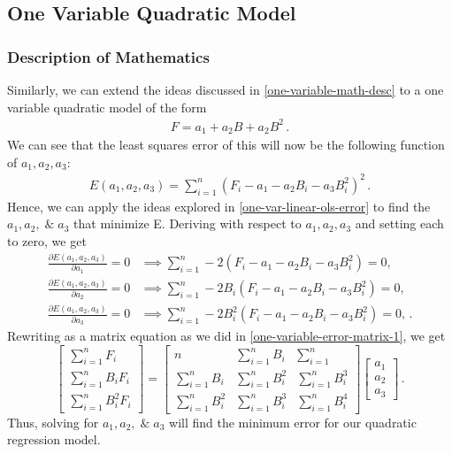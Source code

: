 \documentclass[11pt]{article}
\begin{document}
\subsection{One Variable Quadratic Model}
\subsubsection{Description of Mathematics}
Similarly, we can extend the ideas discussed in \ref{one-variable-math-desc} to a one variable quadratic model of the form
\begin{align*}
    F = a_1 + a_2 B + a_2 B^2 \, .
\end{align*}
We can see that the least squares error of this will now be the following function of $a_1, a_2, a_3$:
\begin{align*}
    E(a_1, a_2, a_3) = \sum_{i=1}^{n}(F_i - a_1 - a_2 B_i - a_3 B_i^2)^2 \, .
\end{align*}
Hence, we can apply the ideas explored in \ref{one-var-linear-ols-error} to find the $a_1, a_2, \; \& \; a_3$ that minimize E.  Deriving with respect to $a_1, a_2, a_3$ and setting each to zero, we get 
\begin{align*}
    \frac{\partial E(a_1, a_2, a_3)}{\partial a_1} = 0 & \implies \sum_{i=1}^{n} -2 (F_i - a_1 - a_2 B_i - a_3 B_i^2) = 0, \\
    \frac{\partial E(a_1, a_2, a_3)}{\partial a_2} = 0 & \implies \sum_{i=1}^{n} -2 B_i(F_i - a_1 - a_2 B_i - a_3 B_i^2) = 0, \\ 
    \frac{\partial E(a_1, a_2, a_3)}{\partial a_3} = 0 & \implies \sum_{i=1}^{n} -2 B_i^2 (F_i - a_1 - a_2 B_i - a_3 B_i^2) = 0, \, .
\end{align*}
Rewriting as a matrix equation as we did in \ref{one-variable-error-matrix-1}, we get
\label{one-variable-error-matrix-2}
\begin{equation*}
    \begin{bmatrix}
        \sum_{i=1}^{n}F_i \\
        \sum_{i=1}^{n}B_i F_i \\
        \sum_{i=1}^{n}B_i^2 F_i
    \end{bmatrix}
    =
    \begin{bmatrix}
        n & \sum_{i=1}^{n} B_i & \sum_{i=1}^{n} \\
        \sum_{i=1}^{n} B_i & \sum_{i=1}^{n} B_i^2 & \sum_{i=1}^{n} B_i^3 \\
        \sum_{i=1}^{n} B_i^2 & \sum_{i=1}^{n} B_i^3 & \sum_{i=1}^{n} B_i^4
    \end{bmatrix} 
    \begin{bmatrix}
        a_1 \\
        a_2 \\
        a_3
    \end{bmatrix} \, .
\end{equation*}
Thus, solving for $a_1, a_2, \; \& \; a_3$ will find the minimum error for our quadratic regression model.
\end{document}
